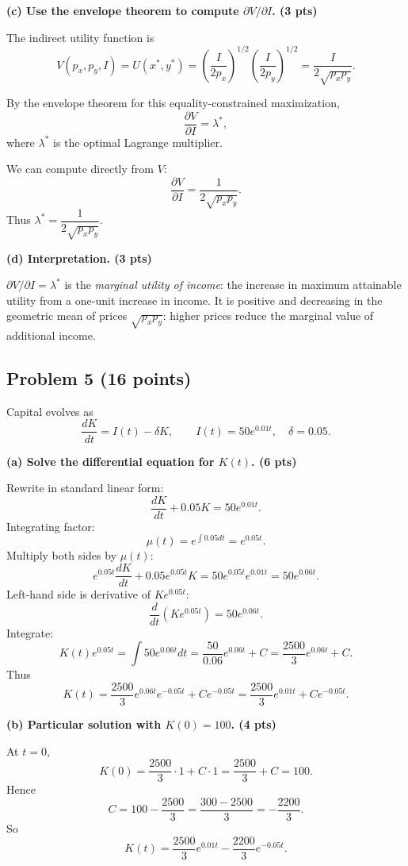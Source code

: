 \documentclass[12pt]{article}
\begin{document}
\textbf{(c) Use the envelope theorem to compute \(\partial V / \partial I\). (3 pts)}

The indirect utility function is
\[
V(p_x,p_y,I) = U(x^\ast,y^\ast) 
= \left(\frac{I}{2p_x}\right)^{1/2}\left(\frac{I}{2p_y}\right)^{1/2}
= \frac{I}{2\sqrt{p_x p_y}}.
\]

By the envelope theorem for this equality-constrained maximization,
\[
\frac{\partial V}{\partial I} = \lambda^\ast,
\]
where \(\lambda^\ast\) is the optimal Lagrange multiplier.

We can compute directly from \(V\):
\[
\frac{\partial V}{\partial I} 
= \frac{1}{2\sqrt{p_x p_y}}.
\]
Thus \(\lambda^\ast = \dfrac{1}{2\sqrt{p_x p_y}}\).

\textbf{(d) Interpretation. (3 pts)}

\(\partial V/\partial I = \lambda^\ast\) is the \emph{marginal utility of income}: the increase in maximum attainable utility from a one-unit increase in income. It is positive and decreasing in the geometric mean of prices \(\sqrt{p_x p_y}\): higher prices reduce the marginal value of additional income.

\bigskip

\subsection*{Problem 5 (16 points)}

Capital evolves as
\[
\frac{dK}{dt} = I(t) - \delta K,\qquad I(t)=50 e^{0.01 t},\quad \delta = 0.05.
\]

\textbf{(a) Solve the differential equation for \(K(t)\). (6 pts)}

Rewrite in standard linear form:
\[
\frac{dK}{dt} + 0.05 K = 50 e^{0.01 t}.
\]
Integrating factor:
\[
\mu(t) = e^{\int 0.05 dt} = e^{0.05 t}.
\]
Multiply both sides by \(\mu(t)\):
\[
e^{0.05t}\frac{dK}{dt} + 0.05 e^{0.05 t} K = 50 e^{0.05 t} e^{0.01 t}
= 50 e^{0.06 t}.
\]
Left-hand side is derivative of \(K e^{0.05 t}\):
\[
\frac{d}{dt}(K e^{0.05 t}) = 50 e^{0.06 t}.
\]
Integrate:
\[
K(t)e^{0.05 t} = \int 50 e^{0.06 t} dt = \frac{50}{0.06} e^{0.06 t} + C
= \frac{2500}{3} e^{0.06 t} + C.
\]
Thus
\[
K(t) = \frac{2500}{3} e^{0.06 t} e^{-0.05 t} + C e^{-0.05 t}
= \frac{2500}{3} e^{0.01 t} + C e^{-0.05 t}.
\]

\textbf{(b) Particular solution with \(K(0)=100\). (4 pts)}

At \(t=0\),
\[
K(0) = \frac{2500}{3}\cdot 1 + C\cdot 1 = \frac{2500}{3} + C = 100.
\]
Hence
\[
C = 100 - \frac{2500}{3} = \frac{300 - 2500}{3} = -\frac{2200}{3}.
\]
So
\[
K(t) = \frac{2500}{3} e^{0.01 t} - \frac{2200}{3} e^{-0.05 t}.
\]
\end{document}
